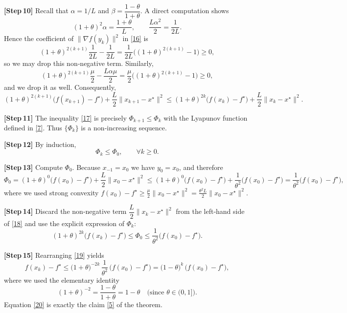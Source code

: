 \documentclass{article}
\begin{document}
\noindent\textbf{[Step 10]}  Recall that $\alpha=1/L$ and $\beta=\dfrac{1-\theta}{1+\theta}$.
A direct computation shows
\[
(1+\theta)^{2}\alpha = \frac{1+\theta}{L},\qquad
\frac{L\alpha^{2}}{2}= \frac{1}{2L}.
\]
Hence the coefficient of $\|\nabla f(y_{k})\|^{2}$ in \eqref{16} is
\[
(1+\theta)^{2(k+1)}\frac{1}{2L}-\frac{1}{2L}= \frac{1}{2L}\bigl((1+\theta)^{2(k+1)}-1\bigr)\ge0,
\]
so we may drop this non‑negative term.  Similarly,
\[
(1+\theta)^{2(k+1)}\frac{\mu}{2}-\frac{L\alpha\mu}{2}
   =\frac{\mu}{2}\bigl((1+\theta)^{2(k+1)}-1\bigr)\ge0,
\]
and we drop it as well.  Consequently,
\[
(1+\theta)^{2(k+1)}\!\bigl(f(x_{k+1})-f^{\star}\bigr)
   +\frac{L}{2}\|x_{k+1}-x^{\star}\|^{2}
\le
(1+\theta)^{2k}\!\bigl(f(x_{k})-f^{\star}\bigr)
   +\frac{L}{2}\|x_{k}-x^{\star}\|^{2}.
\tag{17}
\]

\noindent\textbf{[Step 11]}  The inequality \eqref{17} is precisely
$\Phi_{k+1}\le\Phi_{k}$ with the Lyapunov function defined in \eqref{7}.
Thus $\{\Phi_{k}\}$ is a non‑increasing sequence.

\noindent\textbf{[Step 12]}  By induction,
\[
\Phi_{k}\le\Phi_{0},\qquad\forall k\ge0.
\tag{18}
\]

\noindent\textbf{[Step 13]}  Compute $\Phi_{0}$.  Because $x_{-1}=x_{0}$ we have
$y_{0}=x_{0}$, and therefore
\[
\Phi_{0}= (1+\theta)^{0}\bigl(f(x_{0})-f^{\star}\bigr)
        +\frac{L}{2}\|x_{0}-x^{\star}\|^{2}
        \le (1+\theta)^{0}\bigl(f(x_{0})-f^{\star}\bigr)
        +\frac{1}{\theta^{2}}\bigl(f(x_{0})-f^{\star}\bigr)
        =\frac{1}{\theta^{2}}\bigl(f(x_{0})-f^{\star}\bigr),
\]
where we used strong convexity
$f(x_{0})-f^{\star}\ge \frac{\mu}{2}\|x_{0}-x^{\star}\|^{2}
=\frac{\theta^{2}L}{2}\|x_{0}-x^{\star}\|^{2}$.

\noindent\textbf{[Step 14]}  Discard the non‑negative term $\dfrac{L}{2}\|x_{k}-x^{\star}\|^{2}$
from the left‑hand side of \eqref{18} and use the explicit expression of
$\Phi_{k}$:
\[
(1+\theta)^{2k}\bigl(f(x_{k})-f^{\star}\bigr)
\le \Phi_{0}\le \frac{1}{\theta^{2}}\bigl(f(x_{0})-f^{\star}\bigr).
\tag{19}
\]

\noindent\textbf{[Step 15]}  Rearranging \eqref{19} yields
\[
f(x_{k})-f^{\star}
\le
\bigl(1+\theta\bigr)^{-2k}\,\frac{1}{\theta^{2}}\,
\bigl(f(x_{0})-f^{\star}\bigr)
=
\bigl(1-\theta\bigr)^{k}\,
\bigl(f(x_{0})-f^{\star}\bigr),
\tag{20}
\]
where we used the elementary identity
\[
(1+\theta)^{-2}
=\frac{1-\theta}{1+\theta}
=1-\theta\quad\text{(since }\theta\in(0,1]\text{)}.
\]
Equation \eqref{20} is exactly the claim \eqref{5} of the theorem.
\end{document}
